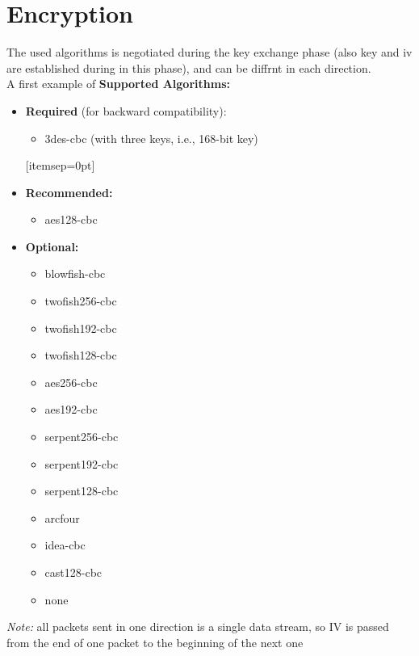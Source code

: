 \section{Encryption}
The used algorithms is negotiated during the key exchange phase (also key and iv are  established during in this phase), and can be diffrnt in each direction. \\
A first example of \textbf{Supported Algorithms:}
    \begin{itemize}[itemsep=0pt]
        \item \textbf{Required} (for backward compatibility):
        \begin{itemize}
            \item 3des-cbc (with three keys, i.e., 168-bit key)
        \end{itemize}[itemsep=0pt]
        \item \textbf{Recommended:}
        \begin{itemize}
            \item aes128-cbc
        \end{itemize}
        \item \textbf{Optional:}
        \begin{multicols}{3}
            \begin{itemize}[itemsep=0pt]
                \item blowfish-cbc
                \item twofish256-cbc
                \item twofish192-cbc
                \item twofish128-cbc
                \item aes256-cbc
                \item aes192-cbc
                \item serpent256-cbc
                \item serpent192-cbc
                \item serpent128-cbc
                \item arcfour
                \item idea-cbc
                \item cast128-cbc
                \item none
            \end{itemize}
        \end{multicols}
    \end{itemize}

\textit{Note:} all packets sent in one direction is a single data stream, so IV is passed from the end of one packet to the beginning of
the next one

